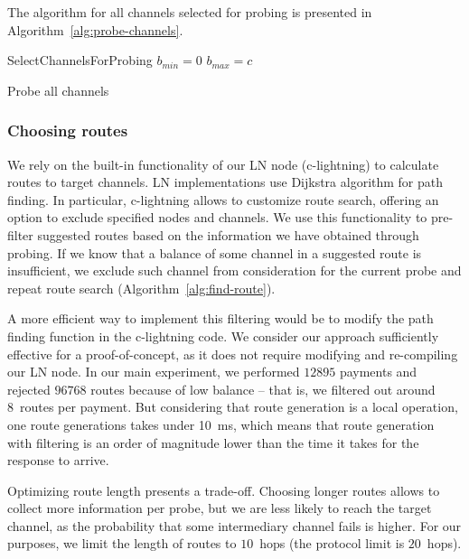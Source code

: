 The algorithm for all channels selected for probing is presented in Algorithm~\ref{alg:probe-channels}.

\begin{algorithm}
	SelectChannelsForProbing\;
	 {	
		$b_{min} = 0$\;
		$b_{max} = c$\;
		 {
		}
	}
	\caption{Probe all channels}
	\label{alg:probe-channels}
\end{algorithm}


\subsubsection{Choosing routes}
We rely on the built-in functionality of our LN node (c-lightning) to calculate routes to target channels.
LN implementations use Dijkstra algorithm for path finding.
In particular, c-lightning allows to customize route search, offering an option to exclude specified nodes and channels.
We use this functionality to pre-filter suggested routes based on the information we have obtained through probing.
If we know that a balance of some channel in a suggested route is insufficient, we exclude such channel from consideration for the current probe and repeat route search (Algorithm~\ref{alg:find-route}).

A more efficient way to implement this filtering would be to modify the path finding function in the c-lightning code.
We consider our approach sufficiently effective for a proof-of-concept, as it does not require modifying and re-compiling our LN node.
In our main experiment, we performed $12895$ payments and rejected $96768$ routes because of low balance -- that is, we filtered out around 8~routes per payment.
But considering that route generation is a local operation, one route generations takes under 10~ms, which means that route generation with filtering is an order of magnitude lower than the time it takes for the response to arrive.

Optimizing route length presents a trade-off.
Choosing longer routes allows to collect more information per probe, but we are less likely to reach the target channel, as the probability that some intermediary channel fails is higher.
For our purposes, we limit the length of routes to $10$~hops (the protocol limit is $20$~hops).


